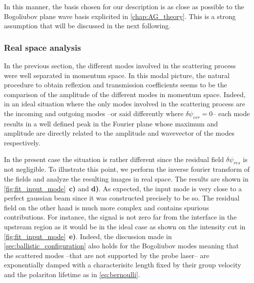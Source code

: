 In this manner, the basis chosen for our description is as close as possible to the Bogoliubov plane wave basis explicited in \autoref{chap:AG_theory}. This is a strong assumption 
that will be discussed in the next following. 


\subsubsection{Real space analysis}
In the previous section, the different modes involved in the scattering process were well separated in momentum space. In this modal picture, the natural procedure to obtain reflexion and transmission coefficients seems
to be the comparison of the amplitude of the different modes in momentum space. Indeed, in an ideal situation where the only modes involved in the scattering process are the incoming and outgoing modes --or said differently where $\delta\psi_{err}=0$-- each mode results in a well defined peak in the Fourier plane whose maximum and amplitude are directly related to the amplitude and wavevector of the modes respectively. 


In the present case the situation is rather different since the residual field $\delta \psi_{res}$ is not negligible. To illustrate this point, we perform the inverse fourier transform of the fields and analyze the resulting images in real space.
The results are shown in \autoref{fig:fit_input_mode}~\textbf{c)} and \textbf{d)}. As expected, the input mode is very close to a perfect gaussian beam since it was constructed precisely to be so.
The residual field on the other hand is much more complex and contains spurious contributions. For instance, the signal is not zero far from the interface in the upstream region as it would be in the ideal case as shown on the intensity cut in \autoref{fig:fit_input_mode}~\textbf{e)}.
 Indeed, the discussion made in \autoref{sec:ballistic_configuration} also holds for the Bogoliubov modes meaning that the scattered modes --that are not supported by the probe laser--
are exponentially damped with a characterisitc length fixed by their group velocity and the polariton lifetime as in \autoref{eq:bernoulli}.


